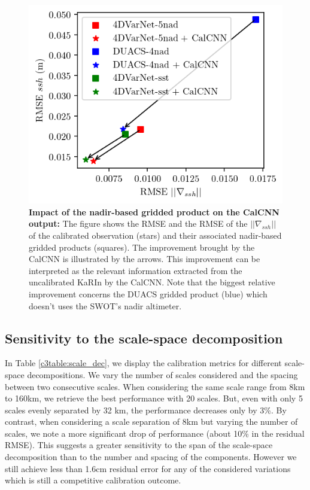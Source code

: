 \begin{bibunit}
\begin{figure}
    \begin{center}
        \includegraphics{00_Calib/gridded_impact.png}
    \end{center}
    \caption{{\bf Impact of the nadir-based gridded product on the CalCNN output:} The figure shows the RMSE and the RMSE of the $|| \nabla_{ssh} ||$ of the calibrated observation (stars) and their associated nadir-based gridded products (squares). The improvement brought by the CalCNN is illustrated by the arrows. This improvement can be interpreted as the relevant information extracted from the uncalibrated KaRIn by the CalCNN. Note that the biggest relative improvement concerns the DUACS gridded product (blue) which doesn't uses the SWOT's nadir altimeter.}
    \label{c3fig:gridded_impact}
\end{figure}

\subsection*{Sensitivity to the scale-space decomposition}
\label{c3subsec:decomp_sens}
\noindent
In Table \ref{c3table:scale_dec}, we display the calibration metrics for different scale-space decompositions. We vary the number of scales considered and the spacing between two consecutive scales. When considering the same scale range from 8km to 160km, we retrieve the best performance with 20 scales. But, even with only 5 scales evenly separated by 32 km, the performance decreases only by 3\%.
By contrast, when considering a scale separation of 8km but varying the number of scales, we note a more significant drop of performance (about 10\% in the residual RMSE). This suggests a greater sensitivity to the span of the scale-space decomposition than to the number and spacing of the components. 
However we still achieve less than 1.6cm residual error for any of the considered variations which is still a competitive calibration outcome.


\end{bibunit}
